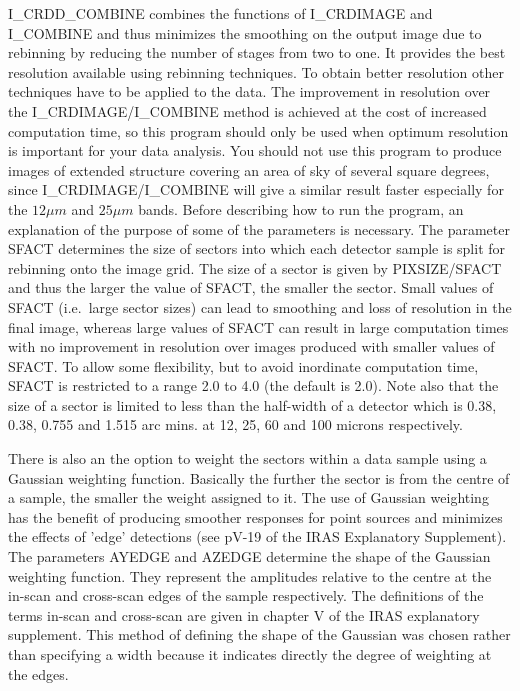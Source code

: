     I\_CRDD\_COMBINE combines the functions of I\_CRDIMAGE and I\_COMBINE and
thus minimizes the smoothing on the output image due to rebinning by reducing
the number of stages from two to one. It provides the best
resolution available using rebinning techniques. To obtain
better resolution other techniques have to be applied to the data. The
improvement in resolution over the I\_CRDIMAGE/I\_COMBINE method is achieved at
the cost of increased computation time, so this program should only be used when
optimum resolution is important for your data analysis. You should not use
this program to produce images of extended structure covering an area of
sky of several square degrees, since I\_CRDIMAGE/I\_COMBINE will give a similar
result faster especially for the $12\mu m$ and $25\mu m$ bands.
   Before describing how to run the program, an explanation of the purpose of
some of the parameters is necessary. The parameter SFACT determines the size of
sectors into which each detector sample is split for rebinning onto the image
grid. The size of a sector is given by PIXSIZE/SFACT and thus the larger the
value of SFACT, the smaller the sector. Small values of SFACT (i.e.\ large
sector sizes) can lead to smoothing and loss of resolution in the final image,
whereas large values of SFACT can result in large computation times with no
improvement in resolution over images produced with smaller values of SFACT.
To allow some flexibility, but to avoid inordinate computation time, SFACT is
restricted to a range 2.0 to 4.0 (the default is 2.0). Note also that the size
of a sector is limited to less than the half-width of a detector which is
0.38, 0.38, 0.755 and 1.515 arc mins. at 12, 25, 60 and 100 microns
respectively.


    There is also an the option to weight the sectors within a data
sample using a Gaussian weighting function. Basically the further the sector is
from the centre of a sample, the smaller the weight assigned to it. The use
of Gaussian weighting has the benefit of producing smoother responses for
point sources and minimizes the effects of 'edge' detections (see pV-19 of
the IRAS Explanatory Supplement). The parameters AYEDGE and AZEDGE determine
the shape of the Gaussian weighting function. They represent the amplitudes
relative to the centre at the in-scan and cross-scan edges of the sample
respectively. The definitions of the terms in-scan and cross-scan are given in
chapter V of the IRAS explanatory supplement. This method of defining the shape
of the Gaussian was chosen rather than specifying a width because it indicates
directly the degree of weighting at the edges.

